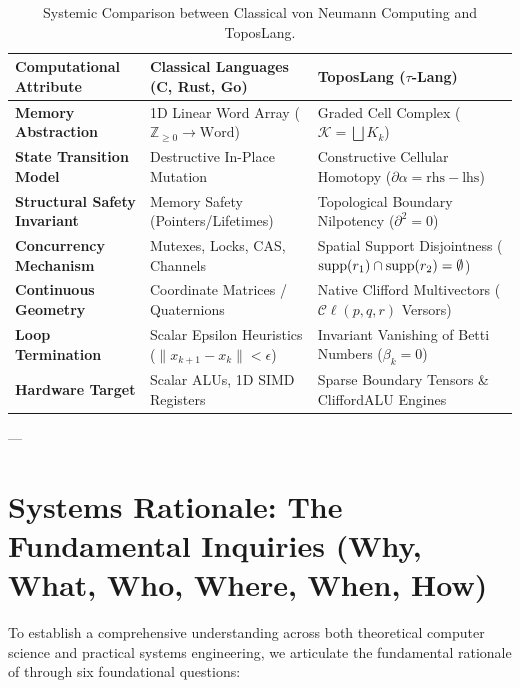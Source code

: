 \begin{table}[t]
\centering
\small
\renewcommand{\arraystretch}{1.25}
\begin{tabular}{@{} l p{5cm} p{6cm} @{}}
\toprule
\textbf{Computational Attribute} & \textbf{Classical Languages (C, Rust, Go)} & \textbf{ToposLang ($\tau$-Lang)} \\
\midrule
\textbf{Memory Abstraction} & 1D Linear Word Array ($\mathbb{Z}_{\ge 0} \to \text{Word}$) & Graded Cell Complex ($\mathcal{K} = \bigsqcup K_k$) \\
\textbf{State Transition Model} & Destructive In-Place Mutation & Constructive Cellular Homotopy ($\partial \alpha = \text{rhs} - \text{lhs}$) \\
\textbf{Structural Safety Invariant} & Memory Safety (Pointers/Lifetimes) & Topological Boundary Nilpotency ($\partial^2 = 0$) \\
\textbf{Concurrency Mechanism} & Mutexes, Locks, CAS, Channels & Spatial Support Disjointness ($\operatorname{supp}(r_1) \cap \operatorname{supp}(r_2) = \emptyset$) \\
\textbf{Continuous Geometry} & Coordinate Matrices / Quaternions & Native Clifford Multivectors ($\mathcal{C}\ell(p,q,r)$ Versors) \\
\textbf{Loop Termination} & Scalar Epsilon Heuristics ($\|x_{k+1}-x_k\| < \epsilon$) & Invariant Vanishing of Betti Numbers ($\beta_k = 0$) \\
\textbf{Hardware Target} & Scalar ALUs, 1D SIMD Registers & Sparse Boundary Tensors \& CliffordALU Engines \\
\bottomrule
\end{tabular}
\caption{Systemic Comparison between Classical von Neumann Computing and ToposLang.}
\label{tab:paradigm_comparison}
\end{table}

---

\section{Systems Rationale: The Fundamental Inquiries (Why, What, Who, Where, When, How)}
\label{sec:systems_rationale}

To establish a comprehensive understanding across both theoretical computer science and practical systems engineering, we articulate the fundamental rationale of \ToposLang{} through six foundational questions:

